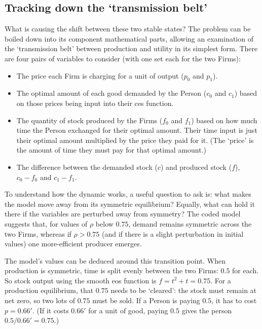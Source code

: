 \subsection{Tracking down the `transmission belt' \label{sec:transmissionbelttrackinz}}

What is causing the shift between these two stable states? The problem can be boiled down into its component mathematical parts, allowing an examination of the `transmission belt' between production and utility in its simplest form. There are four pairs of variables to consider (with one set each for the two Firms): 

\begin{itemize}
	\item The price each Firm is charging for a unit of output ($p_0$ and $p_1$).
	\item The optimal amount of each good demanded by the Person ($c_0$ and $c_1$) based on those prices being input into their \gls{ces} function.
	\item The quantity of stock produced by the Firms ($f_0$ and $f_1$) based on how much time the Person exchanged for their optimal amount. Their time input is just their optimal amount multiplied by the price they paid for it. (The `price' is the amount of time they must pay for that optimal amount.)
	\item The difference between the demanded stock ($c$) and produced stock ($f$), $c_0 - f_0$ and $c_1 - f_1$. 
\end{itemize}

To understand how the dynamic works, a useful question to ask is: what makes the model move away from its symmetric equilibrium? Equally, what can hold it there if the variables are perturbed away from symmetry? The coded model suggests that, for values of $\rho$ below $0.75$, demand remains symmetric across the two Firms, whereas if $\rho > 0.75$ (and if there is a slight perturbation in initial values) one more-efficient producer emerges. 

The model's values can be deduced around this transition point. When production is symmetric, time is split evenly between the two Firms: $0.5$ for each. So stock output using the smooth \gls{eos} function is $f = t^2 + t = 0.75$.  For a production equilibrium, that $0.75$ needs to be `cleared': the stock must remain at net zero, so two lots of $0.75$ must be sold. If a Person is paying $0.5$, it has to cost $p =0.66'$. (If it costs $0.66'$ for a unit of good, paying $0.5$ gives the person $0.5/0.66' = 0.75$.) 

